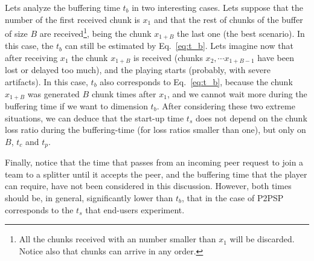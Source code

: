 Lets analyze the buffering time $t_b$ in two interesting cases. Lets
suppose that the number of the first received chunk is $x_1$ and that
the rest of chunks of the buffer of size $B$ are received\footnote{All
  the chunks received with an number smaller than $x_1$ will be
  discarded. Notice also that chunks can arrive in any order.}, being
the chunk $x_{1+B}$ the last one (the best scenario). In this case,
the $t_b$ can still be estimated by Eq.~\ref{eq:t_b}. Lets imagine now
that after receiving $x_1$ the chunk $x_{1+B}$ is received (chunks
$x_2, \cdots x_{1+B-1}$ have been lost or delayed too much), and the
playing starts (probably, with severe artifacts). In this case, $t_b$
also corresponds to Eq.~\ref{eq:t_b}, because the chunk $x_{1+B}$ was
generated $B$ chunk times after $x_1$, and we cannot wait more during
the buffering time if we want to dimension $t_b$. After considering
these two extreme situations, we can deduce that the start-up time
$t_s$ does not depend on the chunk loss ratio during the
buffering-time (for loss ratios smaller than one), but only on $B$,
$t_c$ and $t_p$.

Finally, notice that the time that passes from an incoming peer
request to join a team to a splitter until it accepts the peer, and
the buffering time that the player can require, have not been
considered in this discussion. However, both times should be, in
general, significantly lower than $t_b$, that in the case of P2PSP
corresponds to the $t_s$ that end-users experiment.

